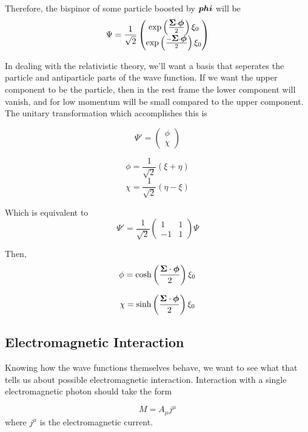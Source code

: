 Therefore, the bispinor of some particle boosted by $\mbox{\boldmath$ phi $}$ will be
\[
\Psi = \frac{1}{\sqrt{2}} \begin{pmatrix} 
		\exp\left( \frac{\mbox{\boldmath$ \Sigma $} \cdot \mbox{\boldmath$ \phi $} }{2} \right)\xi_0 \\ 
		\exp \left( \frac{-\mbox{\boldmath$ \Sigma $} \cdot \mbox{\boldmath$ \phi $} }{2} \right) \xi_0 
	\end{pmatrix}
\]


In dealing with the relativistic theory, we'll want a basis that seperates the particle and antiparticle parts of the wave function.  If we want the upper component to be the particle, then in the rest frame the lower component will vanish, and for low momentum will be small compared to the upper component.  The unitary transformation which accomplishes this is

\[
	\Psi' = \begin{pmatrix} \phi \\ \chi \end{pmatrix}
\]

\[
	\phi = \frac{1}{\sqrt{2}}(\xi + \eta)
\]
\[
	\chi = \frac{1}{\sqrt{2}}( \eta - \xi)
\]

Which is equivalent to
\[
	\Psi' = \frac{1}{\sqrt{2}} \begin{pmatrix}1 & 1 \\ -1 & 1 \end{pmatrix} \Psi
\]

Then,
\[
	\phi =  \cosh \left( \frac{\mbox{\boldmath$ \Sigma $} \cdot \mbox{\boldmath$ \phi $} }{2} \right ) \xi_0
\]

\[
	\chi =  \sinh \left( \frac{\mbox{\boldmath$ \Sigma $} \cdot \mbox{\boldmath$ \phi $} }{2} \right ) \xi_0
\]







\subsection{Electromagnetic Interaction}
Knowing how the wave functions themselves behave, we want to see what that tells us about possible electromagnetic interaction.  Interaction with a single electromagnetic photon should take the form

\[
	M = A_\mu j^\mu 
\]
where $j^\mu$ is the electromagnetic current.


